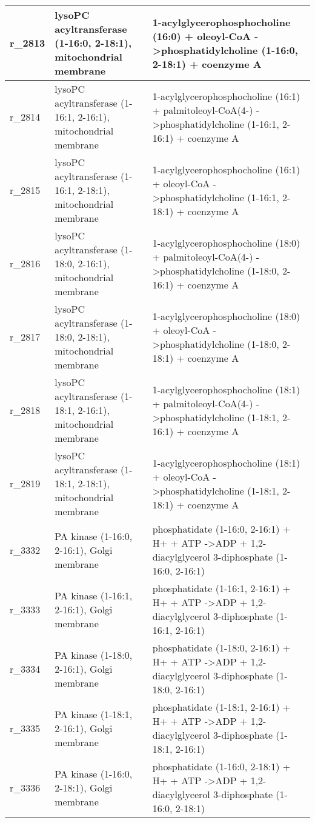 \begin{landscape}
{\begin{longtable}{|l|p{7cm}|p{15cm}|}
r\_2813 & lysoPC acyltransferase (1-16:0, 2-18:1), mitochondrial membrane & 1-acylglycerophosphocholine (16:0) + oleoyl-CoA  -\textgreater phosphatidylcholine (1-16:0, 2-18:1) + coenzyme A \\ \hline
r\_2814 & lysoPC acyltransferase (1-16:1, 2-16:1), mitochondrial membrane & 1-acylglycerophosphocholine (16:1) + palmitoleoyl-CoA(4-)  -\textgreater phosphatidylcholine (1-16:1, 2-16:1) + coenzyme A \\ \hline
r\_2815 & lysoPC acyltransferase (1-16:1, 2-18:1), mitochondrial membrane & 1-acylglycerophosphocholine (16:1) + oleoyl-CoA  -\textgreater phosphatidylcholine (1-16:1, 2-18:1) + coenzyme A \\ \hline
r\_2816 & lysoPC acyltransferase (1-18:0, 2-16:1), mitochondrial membrane & 1-acylglycerophosphocholine (18:0) + palmitoleoyl-CoA(4-)  -\textgreater phosphatidylcholine (1-18:0, 2-16:1) + coenzyme A \\ \hline
r\_2817 & lysoPC acyltransferase (1-18:0, 2-18:1), mitochondrial membrane & 1-acylglycerophosphocholine (18:0) + oleoyl-CoA  -\textgreater phosphatidylcholine (1-18:0, 2-18:1) + coenzyme A \\ \hline
r\_2818 & lysoPC acyltransferase (1-18:1, 2-16:1), mitochondrial membrane & 1-acylglycerophosphocholine (18:1) + palmitoleoyl-CoA(4-)  -\textgreater phosphatidylcholine (1-18:1, 2-16:1) + coenzyme A \\ \hline
r\_2819 & lysoPC acyltransferase (1-18:1, 2-18:1), mitochondrial membrane & 1-acylglycerophosphocholine (18:1) + oleoyl-CoA  -\textgreater phosphatidylcholine (1-18:1, 2-18:1) + coenzyme A \\ \hline
r\_3332 & PA kinase (1-16:0, 2-16:1), Golgi membrane & phosphatidate (1-16:0, 2-16:1) + H+ + ATP  -\textgreater ADP + 1,2-diacylglycerol 3-diphosphate (1-16:0, 2-16:1) \\ \hline
r\_3333 & PA kinase (1-16:1, 2-16:1), Golgi membrane & phosphatidate (1-16:1, 2-16:1) + H+ + ATP  -\textgreater ADP + 1,2-diacylglycerol 3-diphosphate (1-16:1, 2-16:1) \\ \hline
r\_3334 & PA kinase (1-18:0, 2-16:1), Golgi membrane & phosphatidate (1-18:0, 2-16:1) + H+ + ATP  -\textgreater ADP + 1,2-diacylglycerol 3-diphosphate (1-18:0, 2-16:1) \\ \hline
r\_3335 & PA kinase (1-18:1, 2-16:1), Golgi membrane & phosphatidate (1-18:1, 2-16:1) + H+ + ATP  -\textgreater ADP + 1,2-diacylglycerol 3-diphosphate (1-18:1, 2-16:1) \\ \hline
r\_3336 & PA kinase (1-16:0, 2-18:1), Golgi membrane & phosphatidate (1-16:0, 2-18:1) + H+ + ATP  -\textgreater ADP + 1,2-diacylglycerol 3-diphosphate (1-16:0, 2-18:1) \\ \hline

\end{longtable}}
\end{landscape}
